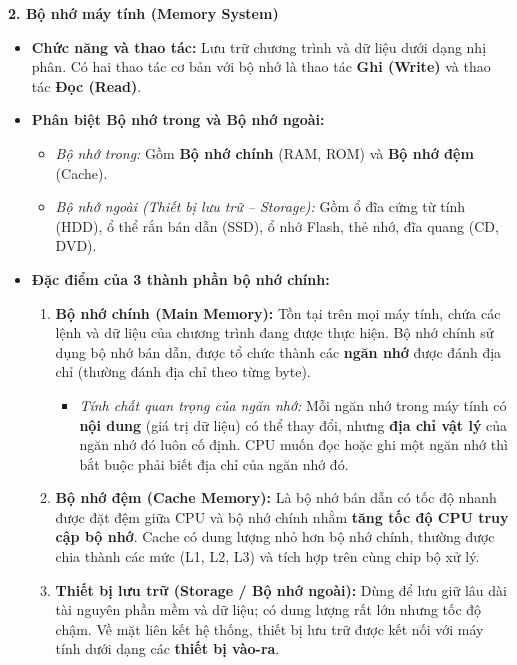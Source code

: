 \textbf{2. Bộ nhớ máy tính (Memory System)}
\begin{itemize}
    \item \textbf{Chức năng và thao tác:} Lưu trữ chương trình và dữ liệu dưới dạng nhị phân. Có hai thao tác cơ bản với bộ nhớ là thao tác \textbf{Ghi (Write)} và thao tác \textbf{Đọc (Read)}.
    \item \textbf{Phân biệt Bộ nhớ trong và Bộ nhớ ngoài:}
    \begin{itemize}
        \item \textit{Bộ nhớ trong:} Gồm \textbf{Bộ nhớ chính} (RAM, ROM) và \textbf{Bộ nhớ đệm} (Cache).
        \item \textit{Bộ nhớ ngoài (Thiết bị lưu trữ -- Storage):} Gồm ổ đĩa cứng từ tính (HDD), ổ thể rắn bán dẫn (SSD), ổ nhớ Flash, thẻ nhớ, đĩa quang (CD, DVD).
    \end{itemize}
    \item \textbf{Đặc điểm của 3 thành phần bộ nhớ chính:}
    \begin{enumerate}
        \item \textbf{Bộ nhớ chính (Main Memory):} Tồn tại trên mọi máy tính, chứa các lệnh và dữ liệu của chương trình đang được thực hiện. Bộ nhớ chính sử dụng bộ nhớ bán dẫn, được tổ chức thành các \textbf{ngăn nhớ} được đánh địa chỉ (thường đánh địa chỉ theo từng byte).
        \begin{itemize}
            \item \textit{Tính chất quan trọng của ngăn nhớ:} Mỗi ngăn nhớ trong máy tính có \textbf{nội dung} (giá trị dữ liệu) có thể thay đổi, nhưng \textbf{địa chỉ vật lý} của ngăn nhớ đó luôn cố định. CPU muốn đọc hoặc ghi một ngăn nhớ thì bắt buộc phải biết địa chỉ của ngăn nhớ đó.
        \end{itemize}
        \item \textbf{Bộ nhớ đệm (Cache Memory):} Là bộ nhớ bán dẫn có tốc độ nhanh được đặt đệm giữa CPU và bộ nhớ chính nhằm \textbf{tăng tốc độ CPU truy cập bộ nhớ}. Cache có dung lượng nhỏ hơn bộ nhớ chính, thường được chia thành các mức (L1, L2, L3) và tích hợp trên cùng chip bộ xử lý.
        \item \textbf{Thiết bị lưu trữ (Storage / Bộ nhớ ngoài):} Dùng để lưu giữ lâu dài tài nguyên phần mềm và dữ liệu; có dung lượng rất lớn nhưng tốc độ chậm. Về mặt liên kết hệ thống, thiết bị lưu trữ được kết nối với máy tính dưới dạng các \textbf{thiết bị vào-ra}.
    \end{enumerate}
\end{itemize}

